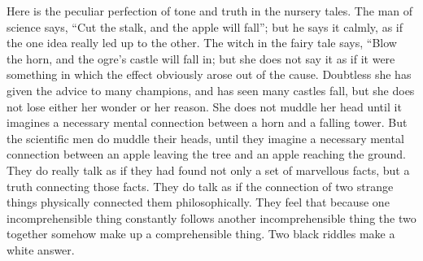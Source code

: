 \documentclass{book}
\begin{document}
Here is the peculiar perfection of tone and truth in the nursery tales. The man of science says, “Cut the stalk, and the apple will fall”; but he says it calmly, as if the one idea really led up to the other. The witch in the fairy tale says, “Blow the horn, and the ogre’s castle will fall in; but she does not say it as if it were something in which the effect obviously arose out of the cause. Doubtless she has given the advice to many champions, and has seen many castles fall, but she does not lose either her wonder or her reason. She does not muddle her head until it imagines a necessary mental connection between a horn and a falling tower. But the scientific men do muddle their heads, until they imagine a necessary mental connection between an apple leaving the tree and an apple reaching the ground. They do really talk as if they had found not only a set of marvellous facts, but a truth connecting those facts. They do talk as if the connection of two strange things physically connected them philosophically. They feel that because one incomprehensible thing constantly follows another incomprehensible thing the two together somehow make up a comprehensible thing. Two black riddles make a white answer.
\end{document}
